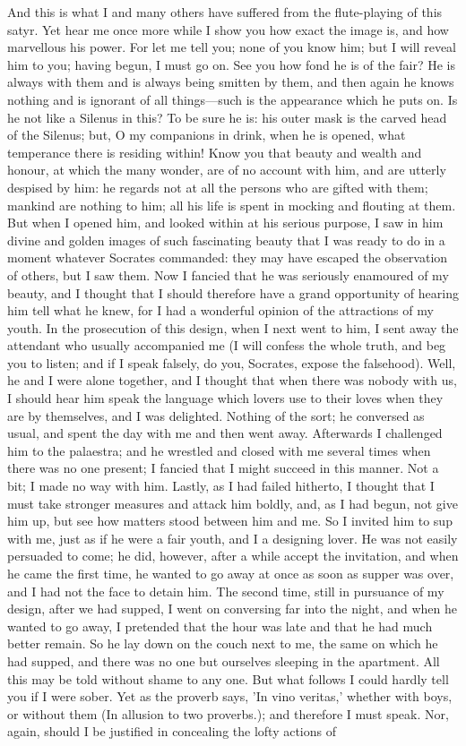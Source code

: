 \para[148] And this is what I and many others have suffered from the flute-playing of this satyr. Yet hear me once more while I show you how exact the image is, and how marvellous his power. For let me tell you; none of you know him; but I will reveal him to you; having begun, I must go on. See you how fond he is of the fair? He is always with them and is always being smitten by them, and then again he knows nothing and is ignorant of all things---such is the appearance which he puts on. Is he not like a Silenus in this? To be sure he is: his outer mask is the carved head of the Silenus; but, O my companions in drink, when he is opened, what temperance there is residing within! Know you that beauty and wealth and honour, at which the many wonder, are of no account with him, and are utterly despised by him: he regards not at all the persons who are gifted with them; mankind are nothing to him; all his life is spent in mocking and flouting at them. But when I opened him, and looked within at his serious purpose, I saw in him divine and golden images of such fascinating beauty that I was ready to do in a moment whatever Socrates commanded: they may have escaped the observation of others, but I saw them. Now I fancied that he was seriously enamoured of my beauty, and I thought that I should therefore have a grand opportunity of hearing him tell what he knew, for I had a wonderful opinion of the attractions of my youth. In the prosecution of this design, when I next went to him, I sent away the attendant who usually accompanied me (I will confess the whole truth, and beg you to listen; and if I speak falsely, do you, Socrates, expose the falsehood). Well, he and I were alone together, and I thought that when there was nobody with us, I should hear him speak the language which lovers use to their loves when they are by themselves, and I was delighted. Nothing of the sort; he conversed as usual, and spent the day with me and then went away. Afterwards I challenged him to the palaestra; and he wrestled and closed with me several times when there was no one present; I fancied that I might succeed in this manner. Not a bit; I made no way with him. Lastly, as I had failed hitherto, I thought that I must take stronger measures and attack him boldly, and, as I had begun, not give him up, but see how matters stood between him and me. So I invited him to sup with me, just as if he were a fair youth, and I a designing lover. He was not easily persuaded to come; he did, however, after a while accept the invitation, and when he came the first time, he wanted to go away at once as soon as supper was over, and I had not the face to detain him. The second time, still in pursuance of my design, after we had supped, I went on conversing far into the night, and when he wanted to go away, I pretended that the hour was late and that he had much better remain. So he lay down on the couch next to me, the same on which he had supped, and there was no one but ourselves sleeping in the apartment. All this may be told without shame to any one. But what follows I could hardly tell you if I were sober. Yet as the proverb says, 'In vino veritas,' whether with boys, or without them (In allusion to two proverbs.); and therefore I must speak. Nor, again, should I be justified in concealing the lofty actions of 
